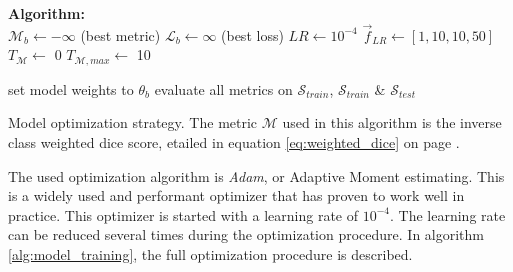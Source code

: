 \begin{algorithm}[H]
    \SetAlgoLined
    \textbf{Algorithm:} \\
    $\mathcal{M}_b \leftarrow -\infty $ (best metric)\;
    $\mathcal{L}_b \leftarrow \infty $ (best loss)\;
    $LR \leftarrow 10^{-4}$ \;
    $\vec{f}_{LR} \leftarrow \left[ 1, 10, 10, 50 \right] $ \;
    $T_{\mathcal{M}} \leftarrow$ 0 \;
    $T_{\mathcal{M}, max} \leftarrow $ 10 \;

   set model weights to $\theta_b$ \;
   evaluate all metrics on $\mathcal{S}_{train}$, $\mathcal{S}_{train}$ \& $\mathcal{S}_{test}$ \;
    
    \caption{Model optimization strategy\label{alg:model_training}. The metric $\mathcal{M}$ used in this algorithm is the inverse class weighted dice score, etailed in equation \ref{eq:weighted_dice} on page \pageref{eq:weighted_dice}.}
\end{algorithm}

\par{
    The used optimization algorithm is \textit{Adam}, or Adaptive Moment estimating.
    This is a widely used and performant optimizer that has proven to work well in practice.
    This optimizer is started with a learning rate of $10^{-4}$.
    The learning rate can be reduced several times during the optimization procedure.
    In algorithm \ref{alg:model_training}, the full optimization procedure is described.
}
